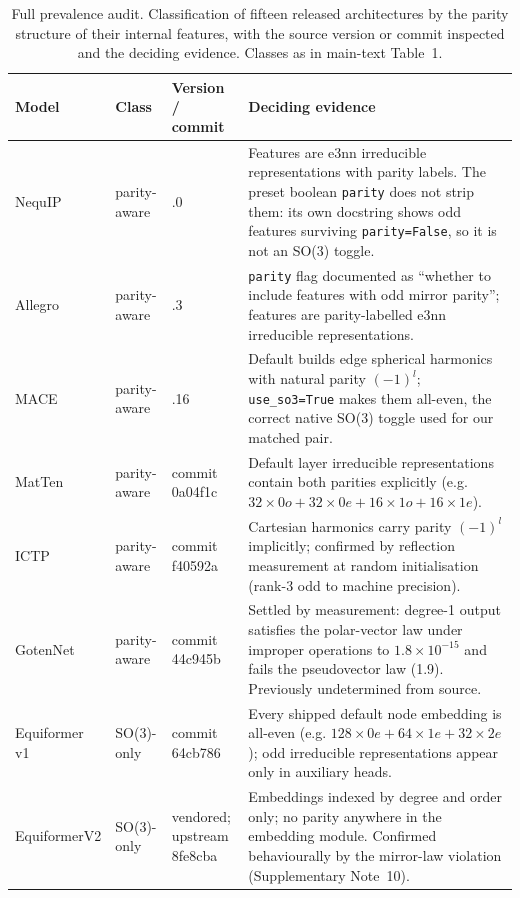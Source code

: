 \begin{table}[htbp]
\centering
\scriptsize
\caption{Full prevalence audit. Classification of fifteen released architectures by the parity structure of their internal features, with the source version or commit inspected and the deciding evidence. Classes as in main-text Table~1.}
\label{stab:audit}
\begin{tabular}{@{}>{\raggedright\arraybackslash}p{2.2cm} l >{\raggedright\arraybackslash}p{1.9cm} >{\raggedright\arraybackslash}p{6.0cm}@{}}
\toprule
Model & Class & Version / commit & Deciding evidence \\
\midrule
NequIP & parity-aware & 0.18.0 & Features are e3nn irreducible representations with parity labels. The preset boolean \texttt{parity} does not strip them: its own docstring shows odd features surviving \texttt{parity=False}, so it is not an SO(3) toggle. \\
Allegro & parity-aware & 0.8.3 & \texttt{parity} flag documented as ``whether to include features with odd mirror parity''; features are parity-labelled e3nn irreducible representations. \\
MACE & parity-aware & 0.3.16 & Default builds edge spherical harmonics with natural parity $(-1)^l$; \texttt{use\_so3=True} makes them all-even, the correct native SO(3) toggle used for our matched pair. \\
MatTen\cite{wen2024matten} & parity-aware & commit 0a04f1c & Default layer irreducible representations contain both parities explicitly (e.g. $32\times0o + 32\times0e + 16\times1o + 16\times1e$). \\
ICTP\cite{zaverkin2024ictp} & parity-aware & commit f40592a & Cartesian harmonics carry parity $(-1)^l$ implicitly; confirmed by reflection measurement at random initialisation (rank-3 odd to machine precision). \\
GotenNet\cite{aykent2025gotennet} & parity-aware & commit 44c945b & Settled by measurement: degree-1 output satisfies the polar-vector law under improper operations to $1.8\times10^{-15}$ and fails the pseudovector law (1.9). Previously undetermined from source. \\
\midrule
Equiformer v1 & SO(3)-only & commit 64cb786 & Every shipped default node embedding is all-even (e.g. $128\times0e+64\times1e+32\times2e$); odd irreducible representations appear only in auxiliary heads. \\
EquiformerV2 & SO(3)-only & vendored; upstream 8fe8cba & Embeddings indexed by degree and order only; no parity anywhere in the embedding module. Confirmed behaviourally by the mirror-law violation (Supplementary Note~10). \\

\end{tabular}
\end{table}
